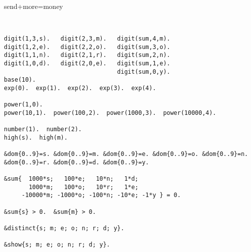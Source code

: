 \begin{frame}[fragile,shrink=1]{send+more=money}
\begin{lstlisting}


digit(1,3,s).   digit(2,3,m).   digit(sum,4,m).
digit(1,2,e).   digit(2,2,o).   digit(sum,3,o).
digit(1,1,n).   digit(2,1,r).   digit(sum,2,n).
digit(1,0,d).   digit(2,0,e).   digit(sum,1,e).
                                digit(sum,0,y).
base(10).
exp(0).  exp(1).  exp(2).  exp(3).  exp(4).

power(1,0).
power(10,1).  power(100,2).  power(1000,3).  power(10000,4).

number(1).  number(2).
high(s).  high(m).

&dom{0..9}=s. &dom{0..9}=m. &dom{0..9}=e. &dom{0..9}=o. &dom{0..9}=n. &dom{0..9}=r. &dom{0..9}=d. &dom{0..9}=y.

&sum{  1000*s;   100*e;   10*n;   1*d;
       1000*m;   100*o;   10*r;   1*e;
     -10000*m; -1000*o; -100*n; -10*e; -1*y } = 0.

&sum{s} > 0.  &sum{m} > 0.

&distinct{s; m; e; o; n; r; d; y}.

&show{s; m; e; o; n; r; d; y}.
\end{lstlisting}
\end{frame}
%
